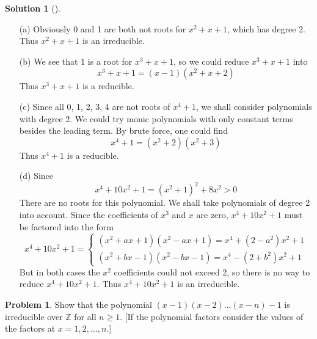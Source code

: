 \documentclass{article}
\theoremstyle{definition}
\newtheorem{prob}{Problem}
\newtheorem*{sol}{Solution}
\newenvironment{sols}[1][]{%
  \begin{sol}[#1]$ $\par\nobreak\ignorespaces
}{%
  \end{sol}
}
\begin{document}
\begin{sols}
	\begin{enumerate}
		\item[(a)] Obviously 0 and 1 are both not roots for $x^2 + x + 1$, which has degree 2.
			Thus $x^2 + x + 1$ is an irreducible. 

		\item[(b)] We see that $1$ is a root for $x^3 + x + 1$, so we could reduce $x^3 + x + 1$ into 
			\[
				x^3 + x + 1 = (x - 1) ( x^2 + x + 2) 
			\]
			Thus $x^3 + x + 1$ is a reducible.

		\item[(c)] Since all 0, 1, 2, 3, 4 are not roots of $x^4 + 1$, we shall consider polynomials with degree 2.
			We could try monic polynomials with only constant terms besides the leading term.
			By brute force, one could find
			\[
				x^4 + 1 = (x^2 + 2)(x^2 + 3)
			\]
			Thus $x^4 + 1$ is a reducible.
			
		\item[(d)] Since 
			\[
				x^4 + 10x^2 + 1 = (x^2 + 1)^2 + 8 x^2 > 0
			\]
			There are no roots for this polynomial. 
			We shall take polynomials of degree 2 into account. 
			Since the coefficients of $x^3$ and $x$ are zero, $x^4 + 10 x^2 + 1$ must be factored into the form 
			\[
				x^4 + 10 x^2 + 1 = 
				\begin{cases}
					(x^2 + ax + 1)(x^2 - ax + 1) = x^4 + (2 - a^2) x^2 + 1\\
					(x^2 + bx - 1)(x^2 - bx - 1) = x^4 - (2 + b^2) x^2 + 1
				\end{cases}
			\]
			But in both cases the $x^2$ coefficients could not exceed 2, so there is no way to reduce $x^4 + 10x^2 + 1$.
			Thus $x^4 + 10x^2 + 1$ is an irreducible.

	\end{enumerate}
\end{sols}

\setcounter{prob}{2}
\begin{prob}
	Show that the polynomial $(x - 1)(x - 2) \hdots (x - n) - 1$ is irreducible over $\mathbb{Z}$ for all $n \geq 1$.
	[If the polynomial factors consider the values of the factors at $x = 1, 2, ..., n.$]
\end{prob}
\end{document}
